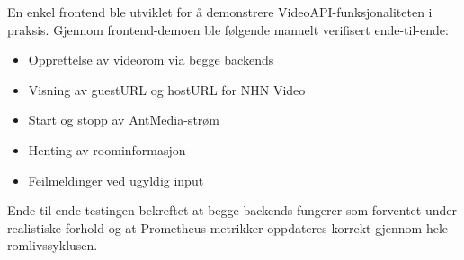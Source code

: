En enkel frontend ble utviklet for å demonstrere 
VideoAPI-funksjonaliteten i praksis. Gjennom 
frontend-demoen ble følgende manuelt verifisert 
ende-til-ende:

\begin{itemize}
    \item Opprettelse av videorom via begge backends
    \item Visning av guestURL og hostURL for NHN Video
    \item Start og stopp av AntMedia-strøm
    \item Henting av roominformasjon
    \item Feilmeldinger ved ugyldig input
\end{itemize}

Ende-til-ende-testingen bekreftet at begge backends 
fungerer som forventet under realistiske forhold og 
at Prometheus-metrikker oppdateres korrekt gjennom 
hele romlivssyklusen.